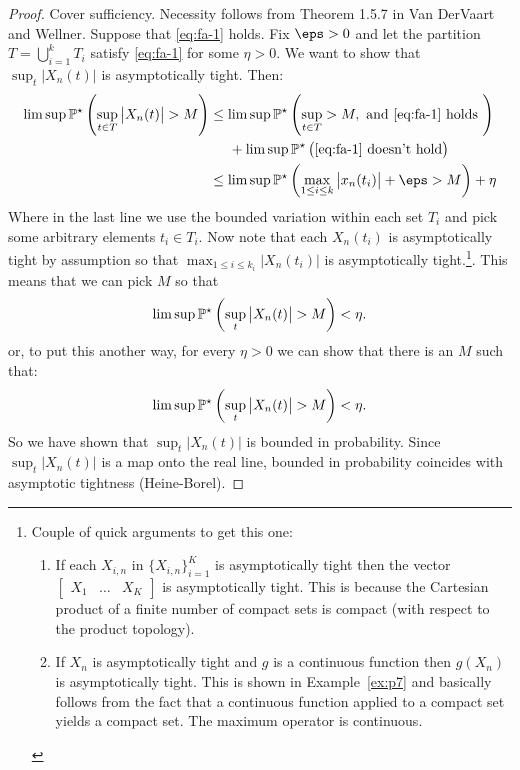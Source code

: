 \begin{proof}
	Cover sufficiency. Necessity follows from Theorem 1.5.7 in Van DerVaart and Wellner.
	Suppose that \eqref{eq:fa-1} holds. Fix \(\eps > 0\) and let the partition \(T = \bigcup_{i=1}^k T_i\) satisfy \eqref{eq:fa-1} for some \(\eta > 0\). We want to show that \(\sup_t \left|X_n(t)\right|\) is asymptotically tight. Then:
	\begin{align*}
		\lim\sup \P^\star\left(\sup_{t\in T}\left|X_n(t)\right|>M\right)
		&\leq \lim\sup \P^\star\left(\sup_{t\in T} > M, \text{ and } \eqref{eq:fa-1}\text{ holds }\right)\\
		&\;\;\;\;\;+ \lim\sup \P^\star\left(\eqref{eq:fa-1}\text{ doesn't hold}\right) \\
		&\leq \lim\sup\P^\star\left(\max_{1\leq i\leq k}\left|x_n(t_i)\right|+\eps > M\right) + \eta
	\end{align*}
	Where in the last line we use the bounded variation within each set \(T_i\) and pick some arbitrary elements  \(t_i \in T_i\). Now note that each  \(X_n(t_i)\) is asymptotically tight by assumption so that  \(\max_{1\leq i\leq k_i}\left|X_n(t_i)\right|\) is asymptotically tight.\footnote{ Couple of quick arguments to get this one:
	\begin{enumerate}
		\item If each \(X_{i,n}\) in \(\{X_{i,n}\}_{i=1}^K\) is asymptotically tight then the vector \(\begin{bmatrix} X_1&\dots&X_K \end{bmatrix} \) is asymptotically tight. This is because the Cartesian product of a finite number of compact sets is compact (with respect to the product topology).
		\item If \(X_n\) is asymptotically tight and \(g\) is a continuous function then  \(g(X_n)\) is asymptotically tight. This is shown in Example~\ref{ex:p7} and basically follows from the fact that a continuous function applied to a compact set yields a compact set. The maximum operator is continuous. 
	\end{enumerate}}.
	This means that we can pick \(M\) so that
	 \[
		 \limsup \P^\star\left(\sup_t \left|X_n(t)\right|>M\right)<\eta
	.\] 
	or, to put this another way, for every \(\eta > 0\) we can show that there is an  \(M\) such that:
	 \[
		 \lim\sup \P^\star\left(\sup_t \left|X_n(t)\right|>M\right)<\eta
	.\]
	So we have shown that \(\sup_t\left|X_n(t)\right|\) is bounded in probability. Since \(\sup_t\left|X_n(t)\right|\) is a map onto the real line, bounded in probability coincides with asymptotic tightness (Heine-Borel).


\end{proof}
